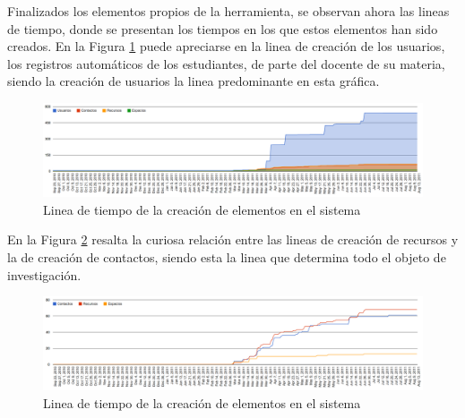 Finalizados los elementos propios de la herramienta, se observan ahora las lineas de tiempo, donde se presentan los tiempos
en los que estos elementos han sido creados.
En la Figura \ref{tiempos_area_1} puede apreciarse en la linea de creaci\'on de los usuarios, los registros autom\'aticos de 
los estudiantes, de parte del docente de su materia, siendo la creaci\'on de usuarios la linea predominante en esta gr\'afica.
\begin{figure}[H]
    \centering
    \includegraphics[scale=0.25]{graphics/tiempos_area_1.png}
    \caption {Linea de tiempo de la creaci\'on de elementos en el sistema}
    \label {tiempos_area_1}
\end{figure}

En la Figura \ref{tiempos_area_2} resalta la curiosa relaci\'on entre las lineas de creaci\'on de recursos y la de creaci\'on
de contactos, siendo esta la linea que determina todo el objeto de investigaci\'on.
\begin{figure}[H]
\centering
    \includegraphics[scale=0.25]{graphics/tiempos_area_2.png}
    \caption {Linea de tiempo de la creaci\'on de elementos en el sistema}
    \label {tiempos_area_2}
\end{figure}

